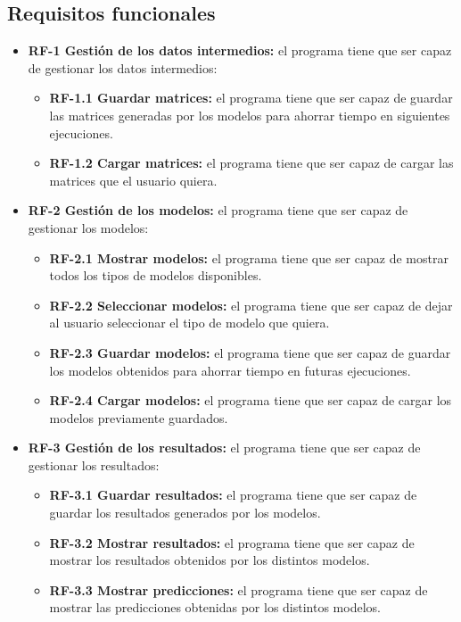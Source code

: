 \subsection{Requisitos funcionales}
\begin{itemize}
\tightlist
\item \textbf{RF-1 Gestión de los datos intermedios:} el programa tiene que ser capaz de gestionar los datos intermedios:
\begin{itemize}
\tightlist
\item \textbf{RF-1.1 Guardar matrices:} el programa tiene que ser capaz de guardar las matrices generadas por los modelos para ahorrar tiempo en siguientes ejecuciones.
\item \textbf{RF-1.2 Cargar matrices:} el programa tiene que ser capaz de cargar las matrices que el usuario quiera.
\end{itemize}
\item \textbf{RF-2 Gestión de los modelos:} el programa tiene que ser capaz de gestionar los modelos:
\begin{itemize}
\tightlist
\item \textbf{RF-2.1 Mostrar modelos:} el programa tiene que ser capaz de mostrar todos los tipos de modelos disponibles.
\item \textbf{RF-2.2 Seleccionar modelos:} el programa tiene que ser capaz de dejar al usuario seleccionar el tipo de modelo que quiera.
\item \textbf{RF-2.3 Guardar modelos:} el programa tiene que ser capaz de guardar los modelos obtenidos para ahorrar tiempo en futuras ejecuciones.
\item \textbf{RF-2.4 Cargar modelos:} el programa tiene que ser capaz de cargar los modelos previamente guardados.
\end{itemize}
\item \textbf{RF-3 Gestión de los resultados:} el programa tiene que ser capaz de gestionar los resultados:
\begin{itemize}
\tightlist
\item \textbf{RF-3.1 Guardar resultados:} el programa tiene que ser capaz de guardar los resultados generados por los modelos.
\item \textbf{RF-3.2 Mostrar resultados:} el programa tiene que ser capaz de mostrar los resultados obtenidos por los distintos modelos.
\item \textbf{RF-3.3 Mostrar predicciones:} el programa tiene que ser capaz de mostrar las predicciones obtenidas por los distintos modelos.
\end{itemize}

\end{itemize}
